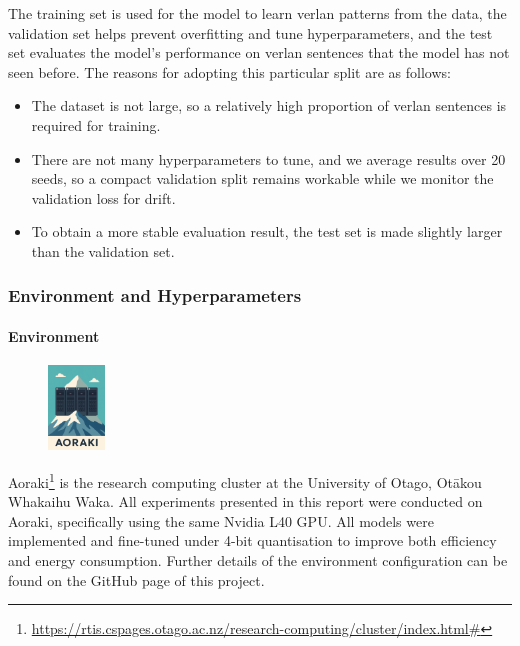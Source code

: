 \documentclass[12pt]{article}
\begin{document}
The training set is used for the model to learn verlan patterns from the data, 
the validation set helps prevent overfitting and tune hyperparameters, 
and the test set evaluates the model's performance on verlan sentences that the model has not seen before.  
The reasons for adopting this particular split are as follows:

\begin{itemize}
  \item The dataset is not large, so a relatively high proportion of verlan sentences is required for training.
  \item There are not many hyperparameters to tune, and we average results over 20 seeds, so a compact validation split remains workable while we monitor the validation loss for drift.
  \item To obtain a more stable evaluation result, the test set is made slightly larger than the validation set.
\end{itemize}


\subsubsection{Environment and Hyperparameters}

\paragraph{Environment}
\begin{figure}
  \vspace{-60pt}
  \begin{minipage}{1\linewidth}
    \centering
    \includegraphics[width=1.5cm]{figures/aoraki.png}
  \end{minipage}%
\end{figure}
Aoraki\footnote{\url{https://rtis.cspages.otago.ac.nz/research-computing/cluster/index.html\#}} 
is the research computing cluster at the University of Otago, Otākou Whakaihu Waka. 
All experiments presented in this report were conducted on Aoraki, specifically using the same Nvidia L40 GPU. 
All models were implemented and fine-tuned under 4-bit quantisation to improve both efficiency and energy consumption. 
Further details of the environment configuration can be found on the GitHub page of this project.
\end{document}
